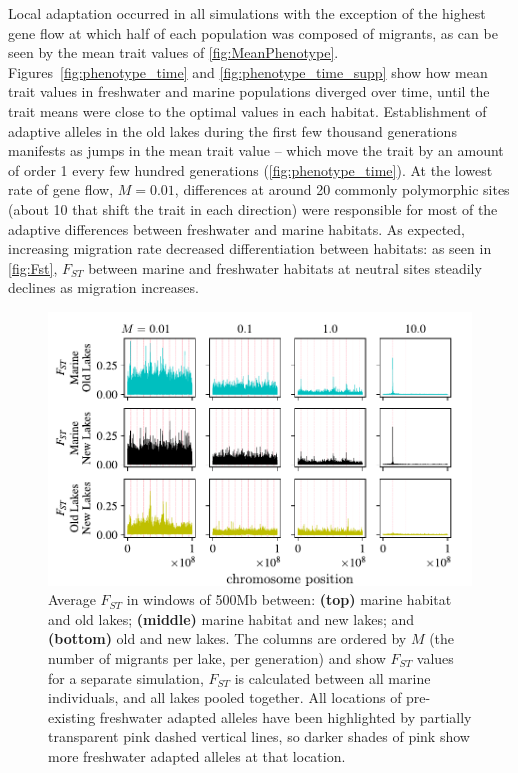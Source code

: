 \documentclass{article}
\begin{document}
Local adaptation occurred in all simulations with the exception of the highest gene flow at which half of each population was composed of migrants, 
as can be seen by the mean trait values of \autoref{fig:MeanPhenotype}.
Figures~\ref{fig:phenotype_time} and \ref{fig:phenotype_time_supp} show how mean trait values in freshwater and marine populations diverged over time, until the trait means were close to the optimal values in each habitat. 
Establishment of adaptive alleles in the old lakes during the first few thousand generations manifests as jumps in the mean trait value -- which move the trait by an amount of order 1 every few hundred generations (\autoref{fig:phenotype_time}). 
At the lowest rate of gene flow, $M = 0.01$, differences at around 20 commonly polymorphic sites (about 10 that shift the trait in each direction) were responsible for most of the adaptive differences between freshwater and marine habitats. 
As expected, increasing migration rate decreased differentiation between habitats: as seen in \autoref{fig:Fst}, $F_{ST}$ between marine and freshwater habitats at neutral sites steadily declines as migration increases.  

\begin{figure}
    \begin{center}
        \includegraphics[width=\textwidth]{Final_Plots/Fst_Genome_faa.pdf}
          \caption{
        Average $F_{ST}$ in windows of 500Mb between:
        \textbf{(top)} marine habitat and old lakes;
        \textbf{(middle)} marine habitat and new lakes; and
        \textbf{(bottom)} old and new lakes.
        The columns are ordered by $M$ (the number of migrants per lake, per generation) 
        and show $F_{ST}$ values for a separate simulation,
        $F_{ST}$ is calculated between all marine individuals, and all lakes pooled together.
        All locations of pre-existing freshwater adapted alleles have been highlighted by 
        partially transparent pink dashed vertical lines, so darker shades of pink show more 
        freshwater adapted alleles at that location.
     } \label{fig:Fst}
    \end{center}
\end{figure}
\end{document}
